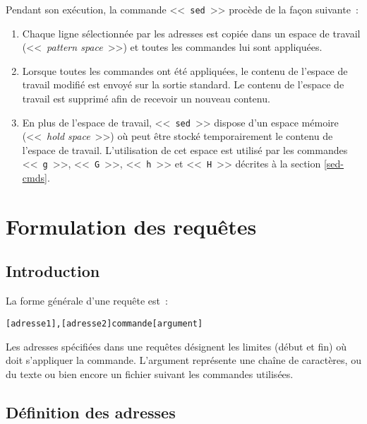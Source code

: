 Pendant son ex{\'e}cution, la commande <<~{\tt sed}~>> proc{\`e}de de la fa\c{c}on
suivante~:
\begin{enumerate}
	\item	Chaque ligne s{\'e}lectionn{\'e}e par les adresses est copi{\'e}e dans un
			espace de travail (<<~{\sl pattern space}~>>) et toutes les
			commandes lui sont appliqu{\'e}es.
	\item	Lorsque toutes les commandes ont {\'e}t{\'e} appliqu{\'e}es, le contenu
			de l'espace de travail modifi{\'e} est envoy{\'e} sur la sortie
			standard. Le contenu de l'espace de travail est supprim{\'e} afin
			de recevoir un nouveau contenu.
	\item	En plus de l'espace de travail, <<~{\tt sed}~>> dispose d'un espace m{\'e}moire
			(<<~{\sl hold space}~>>) o{\`u} peut {\^e}tre stock{\'e} temporairement
			le contenu de l'espace de travail. L'utilisation de cet espace
			est utilis{\'e} par les commandes <<~{\tt g}~>>, <<~{\tt G}~>>,
			<<~{\tt h}~>> et <<~{\tt H}~>> d{\'e}crites {\`a} la section
			\ref{sed-cmds}.
\end{enumerate}

\section{Formulation des requ{\^e}tes}

\subsection{Introduction}

La forme g{\'e}n{\'e}rale d'une requ{\^e}te est~:
\begin{center}
\begin{verbatim}
[adresse1],[adresse2]commande[argument]
\end{verbatim}
\end{center}

Les adresses sp{\'e}cifi{\'e}es dans une requ{\^e}tes d{\'e}signent les limites
(d{\'e}but et fin) o{\`u} doit s'appliquer la  commande. L'argument repr{\'e}sente
une cha{\^i}ne de caract{\`e}res, ou du texte ou bien encore un fichier suivant les
commandes utilis{\'e}es.

\subsection{\label{sed-def-addr}D{\'e}finition des adresses}


